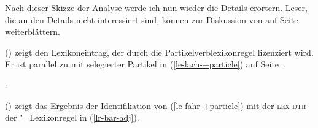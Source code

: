 Nach dieser Skizze der Analyse werde ich nun wieder die Details erörtern.
Leser, die an den Details nicht interessiert sind, können
zur Diskussion von  auf Seite~\pageref{pvs-in-morphology} weiterblättern.

() zeigt den Lexikoneintrag, der durch die Partikelverblexikonregel lizenziert
wird. Er ist parallel zu  mit selegierter Partikel in (\ref{le-lach-+particle}) auf Seite~\pageref{le-lach-+particle}.
\newsavebox{\boxxcompfuenfa}
\ea
\label{le-fahr-+particle}
\begin{minipage}[t]{\linewidth}
\mbox{:}\\
\end{minipage}
\z
() zeigt das Ergebnis der Identifikation von (\ref{le-fahr-+particle}) 
mit der \textsc{lex-dtr} der \bard"=Lexikonregel in (\ref{lr-bar-adj}).

